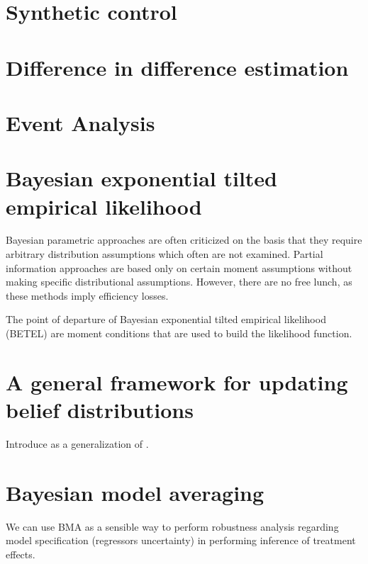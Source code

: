 \section{Synthetic control}\label{sec12_5}
\cite{amjad2018robust,kim2020bayesian}

\section{Difference in difference estimation}\label{sec12_6}
\cite{normington2019bayesian,normington2022bayesian,breunig2024semiparametric}

\section{Event Analysis}\label{sec12_7}

\section{Bayesian exponential tilted empirical likelihood}\label{sec12_8}
Bayesian parametric approaches are often criticized on the basis that they require arbitrary distribution assumptions which often are not examined. Partial information approaches are based only on certain moment assumptions without making specific distributional assumptions. However, there are no free lunch, as these methods imply efficiency losses.

The point of departure of Bayesian exponential tilted empirical likelihood (BETEL) are moment conditions that are used to build the likelihood function.

\section{A general framework for updating belief distributions}\label{sec12_9}
Introduce \cite{bissiri2016general} as a generalization of \cite{chernozhukov2003mcmc}.

\section{Bayesian model averaging}\label{sec12_10}
We can use BMA as a sensible way to perform robustness analysis regarding model specification (regressors uncertainty) in performing inference of treatment effects.


